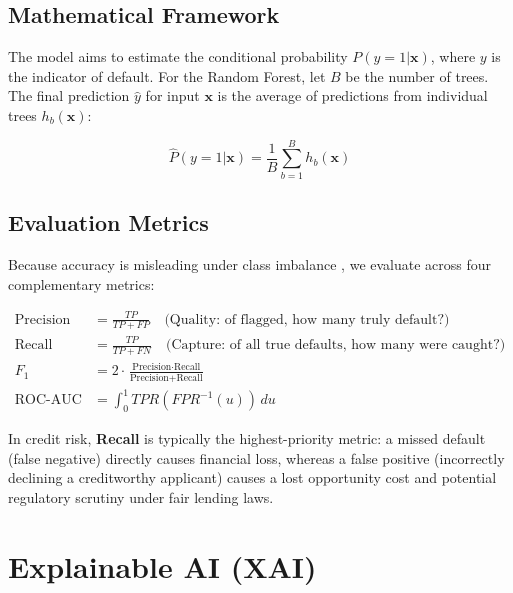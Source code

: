 \documentclass[11pt,a4paper]{article}
\begin{document}
\subsection{Mathematical Framework}

The model aims to estimate the conditional probability $P(y=1 | \mathbf{x})$, where $y$ 
is the indicator of default. For the Random Forest, let $B$ be the number of trees. 
The final prediction $\hat{y}$ for input $\mathbf{x}$ is the average of predictions 
from individual trees $h_b(\mathbf{x})$:

\begin{equation}
    \hat{P}(y=1 | \mathbf{x}) = \frac{1}{B} \sum_{b=1}^{B} h_b(\mathbf{x})
\end{equation}

\subsection{Evaluation Metrics}

Because accuracy is misleading under class imbalance \cite{provost2000}, we evaluate
across four complementary metrics:

\begin{align}
\text{Precision} &= \frac{TP}{TP + FP}
    \quad \text{(Quality: of flagged, how many truly default?)} \\[6pt]
\text{Recall}    &= \frac{TP}{TP + FN}
    \quad \text{(Capture: of all true defaults, how many were caught?)} \\[6pt]
F_1              &= 2 \cdot \frac{\text{Precision} \cdot \text{Recall}}
                       {\text{Precision} + \text{Recall}} \\[6pt]
\text{ROC-AUC}   &= \int_0^1 TPR(FPR^{-1}(u))\,du
\end{align}

In credit risk, \textbf{Recall} is typically the highest-priority metric: a missed default
(false negative) directly causes financial loss, whereas a false positive (incorrectly
declining a creditworthy applicant) causes a lost opportunity cost and potential regulatory
scrutiny under fair lending laws.

\section{Explainable AI (XAI)}
\label{sec:xai}
\end{document}
